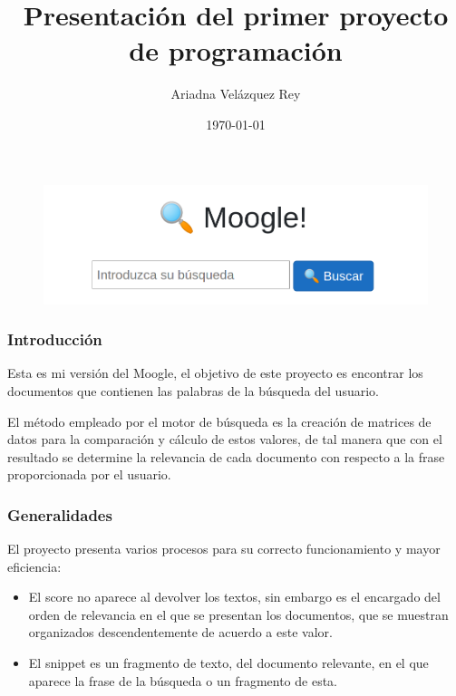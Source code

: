 \documentclass{beamer}
\title{Presentación del primer proyecto de programación}
\author{Ariadna Velázquez Rey}
\date{\today}
\begin{document}
\begin{frame}
    \maketitle

    \begin{figure}[h]
        \centering
        \includegraphics[width=1\textwidth]{moogle}
    \end{figure}
\end{frame}

\begin{frame}
    \frametitle{Introducción}
    Esta es mi versión del Moogle, el objetivo de este proyecto es encontrar los documentos que contienen las palabras 
    de la búsqueda del usuario. 

    El método empleado por el motor de búsqueda es la creación de matrices de datos para la comparación y cálculo de 
    estos valores, de tal manera que con el resultado se determine la relevancia de cada documento con respecto a la 
    frase proporcionada por el usuario.
\end{frame}

\begin{frame}
    \frametitle{Generalidades}
      El proyecto presenta varios procesos para su correcto funcionamiento y mayor eficiencia:

    \begin{itemize}
        \item El score no aparece al devolver los textos, sin embargo es el encargado del orden de relevancia en el 
        que se presentan los documentos, que se muestran organizados descendentemente de acuerdo a este valor.
        \item El snippet es un fragmento de texto, del documento relevante, en el que aparece la frase de la búsqueda 
        o un fragmento de esta.
    \end{itemize}    
\end{frame}
\end{document}
